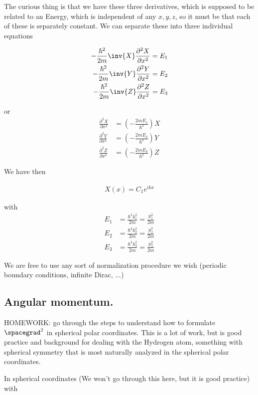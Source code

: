 The curious thing is that we have these three derivatives, which is supposed to be related to an Energy, which is independent of any $x,y,z$, so it must be that each of these is separately constant.  We can separate these into three individual equations

\begin{align*}
-\frac{\hbar^2}{2m} \inv{X} \frac{\partial^2 X}{\partial {x}^2} &= E_1 \\
-\frac{\hbar^2}{2m} \inv{Y} \frac{\partial^2 Y}{\partial {x}^2} &= E_2 \\
-\frac{\hbar^2}{2m} \inv{Z} \frac{\partial^2 Z}{\partial {x}^2} &= E_3
\end{align*}

or
\begin{align*}
\frac{\partial^2 X}{\partial {x}^2} &= \left( - \frac{2m E_1}{\hbar^2} \right) X  \\
\frac{\partial^2 Y}{\partial {x}^2} &= \left( - \frac{2m E_2}{\hbar^2} \right) Y  \\
\frac{\partial^2 Z}{\partial {x}^2} &= \left( - \frac{2m E_3}{\hbar^2} \right) Z
\end{align*}

We have then

\begin{align*}
X(x) = C_1 e^{i k x}
\end{align*}

with
\begin{align*}
E_1 &= \frac{\hbar^2 k_1^2 }{2m} = \frac{p_1^2}{2m} \\
E_2 &= \frac{\hbar^2 k_2^2 }{2m} = \frac{p_2^2}{2m} \\
E_3 &= \frac{\hbar^2 k_3^2 }{2m} = \frac{p_3^2}{2m}
\end{align*}

We are free to use any sort of normalization procedure we wish (periodic boundary conditions, infinite Dirac, ...)

\subsection{Angular momentum.}

HOMEWORK: go through the steps to understand how to formulate $\spacegrad^2$ in spherical polar coordinates.  This is a lot of work, but is good practice and background for dealing with the Hydrogen atom, something with spherical symmetry that is most naturally analyzed in the spherical polar coordinates.

In spherical coordinates (We won't go through this here, but it is good practice) with

